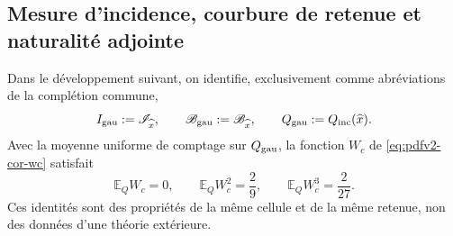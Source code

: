 \subsection{Mesure d'incidence, courbure de retenue et naturalité adjointe}
Dans le développement suivant, on identifie, exclusivement comme abréviations de la complétion commune,
\[
 I_{\rm gau}:=\mathscr I_{\widehat x},\qquad
 \mathscr B_{\rm gau}:=\mathscr B_{\widehat x},\qquad
 Q_{\rm gau}:=Q_{\rm inc}(\widehat x).
\]
Avec la moyenne uniforme de comptage sur \(Q_{\rm gau}\), la fonction \(W_c\) de \eqref{eq:pdfv2-cor-wc} satisfait
\begin{equation}
\label{eq:pdfv2-cor-wc-momentos}
 \mathbb E_QW_c=0,\qquad
 \mathbb E_QW_c^2=\frac29,\qquad
 \mathbb E_QW_c^3=\frac{2}{27}.
\end{equation}
Ces identités sont des propriétés de la même cellule et de la même retenue, non des données d'une théorie extérieure.
\begingroup
\let\section\subsection

\endgroup

